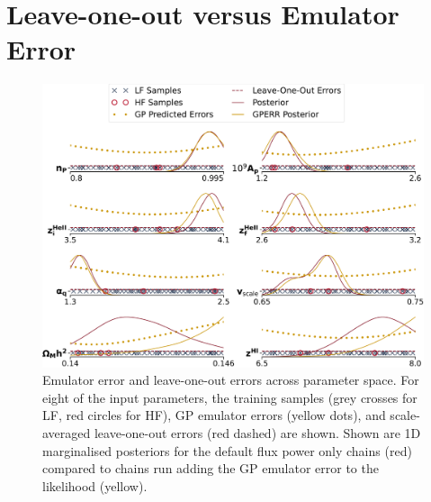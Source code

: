 

\section{Leave-one-out versus Emulator Error}
\label{sec:loovsgperr}
\begin{figure}
    \centering
    \includegraphics[width=\textwidth]{figures/loo_vs_emu_error_wlegend.pdf}
    \caption{\label{fig:loo_v_emu}
    Emulator error and leave-one-out errors across parameter space.
    For eight of the input parameters, the training samples (grey crosses for LF, red circles for HF), GP emulator errors (yellow dots), and scale-averaged leave-one-out errors (red dashed) are shown.
    Shown are 1D marginalised posteriors for the default flux power only chains (red) compared to chains run adding the GP emulator error to the likelihood (yellow).
    }
\end{figure}

